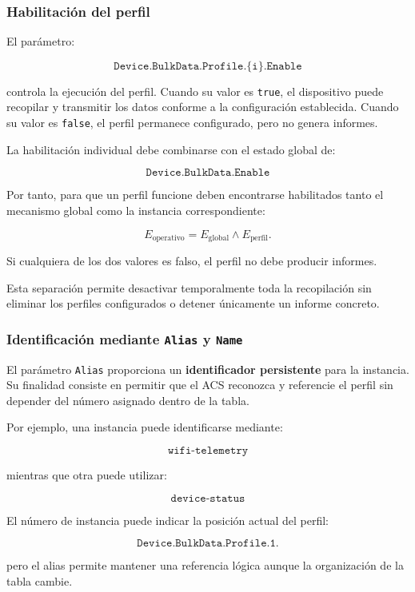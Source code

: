 \subsubsection*{Habilitación del perfil}

El parámetro:

\[
    \texttt{Device.BulkData.Profile.\{i\}.Enable}
\]

controla la ejecución del perfil. Cuando su valor es
\texttt{true}, el dispositivo puede recopilar y transmitir los datos
conforme a la configuración establecida. Cuando su valor es
\texttt{false}, el perfil permanece configurado, pero no genera informes.

La habilitación individual debe combinarse con el estado global de:

\[
    \texttt{Device.BulkData.Enable}
\]

Por tanto, para que un perfil funcione deben encontrarse habilitados tanto
el mecanismo global como la instancia correspondiente:

\[
    E_{\mathrm{operativo}}
    =
    E_{\mathrm{global}}
    \land
    E_{\mathrm{perfil}}.
\]

Si cualquiera de los dos valores es falso, el perfil no debe producir
informes.

Esta separación permite desactivar temporalmente toda la recopilación sin
eliminar los perfiles configurados o detener únicamente un informe
concreto.


\subsubsection*{Identificación mediante \texttt{Alias} y \texttt{Name}}

El parámetro \texttt{Alias} proporciona un
\textbf{identificador persistente} para la instancia. Su finalidad
consiste en permitir que el ACS reconozca y referencie el perfil sin
depender del número asignado dentro de la tabla.

Por ejemplo, una instancia puede identificarse mediante:

\[
    \texttt{wifi-telemetry}
\]

mientras que otra puede utilizar:

\[
    \texttt{device-status}
\]

El número de instancia puede indicar la posición actual del perfil:

\[
    \texttt{Device.BulkData.Profile.1.}
\]

pero el alias permite mantener una referencia lógica aunque la
organización de la tabla cambie.

